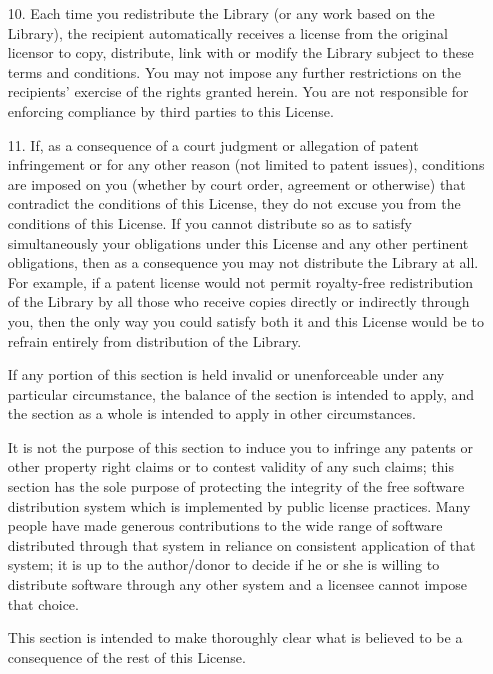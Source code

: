 \begin{multicols}{3}
\begin{itemize}
       \item[10.] Each time you redistribute the Library (or any work
         based on the Library), the recipient automatically receives a
         license from the original licensor to copy, distribute, link
         with or modify the Library subject to these terms and
         conditions. You may not impose any further restrictions on
         the recipients' exercise of the rights granted herein.  You
         are not responsible for enforcing compliance by third parties
         to this License.
         
       \item[11.] If, as a consequence of a court judgment or
         allegation of patent infringement or for any other reason
         (not limited to patent issues), conditions are imposed on you
         (whether by court order, agreement or otherwise) that
         contradict the conditions of this License, they do not excuse
         you from the conditions of this License. If you cannot
         distribute so as to satisfy simultaneously your obligations
         under this License and any other pertinent obligations, then
         as a consequence you may not distribute the Library at all.
         For example, if a patent license would not permit
         royalty-free redistribution of the Library by all those who
         receive copies directly or indirectly through you, then the
         only way you could satisfy both it and this License would be
         to refrain entirely from distribution of the Library.

    If any portion of this section is held invalid or unenforceable under
    any particular circumstance, the balance of the section is intended to
    apply, and the section as a whole is intended to apply in other
    circumstances.

    It is not the purpose of this section to induce you to infringe any
    patents or other property right claims or to contest validity of any
    such claims; this section has the sole purpose of protecting the
    integrity of the free software distribution system which is implemented
    by public license practices. Many people have made generous
    contributions to the wide range of software distributed through that
    system in reliance on consistent application of that system; it is up
    to the author/donor to decide if he or she is willing to distribute
    software through any other system and a licensee cannot impose that
    choice.

    This section is intended to make thoroughly clear what is believed to
    be a consequence of the rest of this License.
    

\end{itemize}
\end{multicols}
